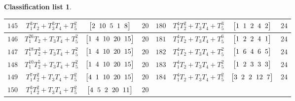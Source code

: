 \documentclass[10pt,a4paper]{amsart}
\theoremstyle{definition}
\newtheorem{class-list}[thm]{Classification list}
\numberwithin{equation}{section}
\begin{document}
\begin{class-list}
\begin{table}[t!]
\begin{tabu}{c|c|c|c||c|c|c|c}
\hline
${145}$&${T_{1}^{3}T_{2}+T_{3}^{3}T_{4}+T_{5}^{2}}$
&$\arraycolsep=1mm\begin{bmatrix}{2} & {10} & {5} & {1} & {8}\end{bmatrix}$&${20}$
&${180}$&${T_{1}^{4}T_{2}^{2}+T_{3}T_{4}+T_{5}^{3}}$
&$\arraycolsep=1mm\begin{bmatrix}{1} & {1} & {2} & {4} & {2}\end{bmatrix}$&${24}$
\\
\hline
${146}$&${T_{1}^{26}T_{2}+T_{3}T_{4}+T_{5}^{2}}$
&$\arraycolsep=1mm\begin{bmatrix}{1} & {4} & {10} & {20} & {15}\end{bmatrix}$&${20}$
&${181}$&${T_{1}^{4}T_{2}+T_{3}T_{4}+T_{5}^{6}}$
&$\arraycolsep=1mm\begin{bmatrix}{1} & {2} & {2} & {4} & {1}\end{bmatrix}$&${24}$
\\
\hline
${147}$&${T_{1}^{18}T_{2}^{3}+T_{3}T_{4}+T_{5}^{2}}$
&$\arraycolsep=1mm\begin{bmatrix}{1} & {4} & {10} & {20} & {15}\end{bmatrix}$&${20}$
&${182}$&${T_{1}^{4}T_{2}+T_{3}T_{4}+T_{5}^{2}}$
&$\arraycolsep=1mm\begin{bmatrix}{1} & {6} & {4} & {6} & {5}\end{bmatrix}$&${24}$
\\
\hline
${148}$&${T_{1}^{10}T_{2}^{5}+T_{3}T_{4}+T_{5}^{2}}$
&$\arraycolsep=1mm\begin{bmatrix}{1} & {4} & {10} & {20} & {15}\end{bmatrix}$&${20}$
&${183}$&${T_{1}^{4}T_{2}+T_{3}T_{4}+T_{5}^{2}}$
&$\arraycolsep=1mm\begin{bmatrix}{1} & {2} & {3} & {3} & {3}\end{bmatrix}$&${24}$
\\
\hline
${149}$&${T_{1}^{7}T_{2}^{2}+T_{3}T_{4}+T_{5}^{2}}$
&$\arraycolsep=1mm\begin{bmatrix}{4} & {1} & {10} & {20} & {15}\end{bmatrix}$&${20}$
&${184}$&${T_{1}^{4}T_{2}+T_{3}T_{4}+T_{5}^{2}}$
&$\arraycolsep=1mm\begin{bmatrix}{3} & {2} & {2} & {12} & {7}\end{bmatrix}$&${24}$
\\
\hline
${150}$&${T_{1}^{3}T_{2}^{2}+T_{3}T_{4}+T_{5}^{2}}$
&$\arraycolsep=1mm\begin{bmatrix}{4} & {5} & {2} & {20} & {11}\end{bmatrix}$&${20}$

\end{tabu}
\end{table}
\end{class-list}
\end{document}
